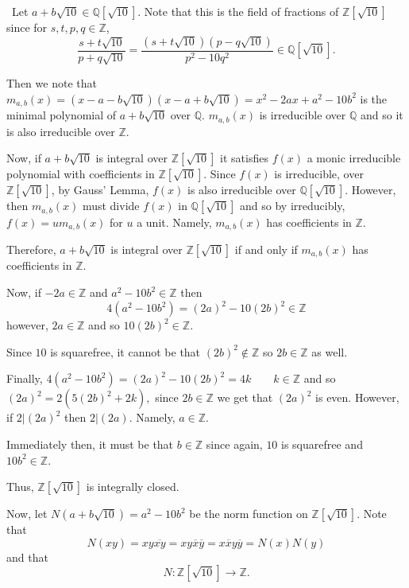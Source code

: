 \documentclass[12pt]{AlgebraQual}
\begin{document}
\begin{solution}$\,$
Let $a+b\sqrt{10}\in\mathbb{Q}[\sqrt{10}]$. Note that this is the field of fractions of $\mathbb{Z}[\sqrt{10}]$ since for $s,t,p,q\in\mathbb{Z}$, $$\frac{s+t\sqrt{10}}{p+q\sqrt{10}}=\frac{(s+t\sqrt{10})(p-q\sqrt{10})}{p^2-10q^2}\in\mathbb{Q}[\sqrt{10}].$$

Then we note that $m_{a,b}(x)=(x-a-b\sqrt{10})(x-a+b\sqrt{10})=x^2-2ax+a^2-10b^2$ is the minimal polynomial of $a+b\sqrt{10}$ over $\mathbb{Q}$. $m_{a,b}(x)$ is irreducible over $\mathbb{Q}$ and so it is also irreducible over $\mathbb{Z}$.

Now, if $a+b\sqrt{10}$ is integral over $\mathbb{Z}[\sqrt{10}]$ it satisfies $f(x)$ a monic irreducible polynomial with coefficients in $\mathbb{Z}[\sqrt{10}]$. Since $f(x)$ is irreducible, over $\mathbb{Z}[\sqrt{10}]$, by Gauss' Lemma, $f(x)$ is also irreducible over $\mathbb{Q}[\sqrt{10}]$. However, then $m_{a,b}(x)$ must divide $f(x)$ in $\mathbb{Q}[\sqrt{10}]$ and so by irreducibly, $f(x)=um_{a,b}(x)$ for $u$ a unit. Namely, $m_{a,b}(x)$ has coefficients in $\mathbb{Z}$.

Therefore, $a+b\sqrt{10}$ is integral over $\mathbb{Z}[\sqrt{10}]$ if and only if $m_{a,b}(x)$ has coefficients in $\mathbb{Z}$.

Now, if $-2a\in\mathbb{Z}$ and $a^2-10b^2\in\mathbb{Z}$ then $$4(a^2-10b^2)=(2a)^2-10(2b)^2\in\mathbb{Z}$$ however, $2a\in\mathbb{Z}$ and so $10(2b)^2\in\mathbb{Z}$.

Since $10$ is squarefree, it cannot be that $(2b)^2\notin\mathbb{Z}$ so $2b\in\mathbb{Z}$ as well.

Finally, $4(a^2-10b^2)=(2a)^2-10(2b)^2=4k\qquad k\in\mathbb{Z}$ and so $(2a)^2=2(5(2b)^2+2k),$ since $2b\in\mathbb{Z}$ we get that $(2a)^2$ is even. However, if $2|(2a)^2$ then $2|(2a)$. Namely, $a\in\mathbb{Z}$.

Immediately then, it must be that $b\in\mathbb{Z}$ since again, $10$ is squarefree and $10b^2\in\mathbb{Z}$.

Thus, $\mathbb{Z}[\sqrt{10}]$ is integrally closed.

Now, let $N(a+b\sqrt{10})=a^2-10b^2$ be the norm function on $\mathbb{Z}[\sqrt{10}]$. Note that $$N(xy)=xy\overline{xy}=xy\overline{x}\overline{y}=x\overline{x}y\overline{y}=N(x)N(y)$$ and that $$N:\mathbb{Z}[\sqrt{10}]\to\mathbb{Z}.$$


\end{solution}
\end{document}
